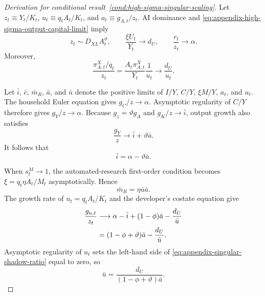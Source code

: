 \begin{proof}[Derivation for conditional result~\ref{cond:high-sigma-singular-scaling}]
Let $z_t\equiv Y_t/K_t$, $u_t\equiv q_tA_t/K_t$, and
$a_t\equiv g_{A,t}/z_t$. AI dominance and
\eqref{eq:appendix-high-sigma-output-capital-limit} imply
\begin{equation}
    z_t\sim D_{XL}A_t^\vartheta,
    \qquad
    \frac{\xi U_t}{Y_t}\longrightarrow d_U,
    \qquad
    \frac{r_t}{z_t}\longrightarrow\alpha.
    \label{eq:appendix-singular-production-limits}
\end{equation}
Moreover,
\begin{equation}
    \frac{\pi^X_{A,t}/q_t}{z_t}
    =
    \frac{A_t\pi^X_{A,t}}{Y_t}\frac{1}{u_t}
    \longrightarrow
    \frac{d_U}{u_t}.
    \label{eq:appendix-singular-profit-value}
\end{equation}

Let $\bar i$, $\bar c$, $\bar m_R$, $\bar a$, and $\bar u$ denote the
positive limits of $I/Y$, $C/Y$, $\xi M/Y$, $a_t$, and $u_t$. The household
Euler equation gives $g_C/z\to\alpha$. Asymptotic regularity of $C/Y$ therefore
gives $g_Y/z\to\alpha$. Because
$g_z=\vartheta g_A$ and $g_K/z\to\bar i$, output growth also satisfies
\[
    \frac{g_Y}{z}
    \longrightarrow
    \bar i+\vartheta\bar a.
\]
It follows that
\begin{equation}
    \bar i=\alpha-\vartheta\bar a.
    \label{eq:appendix-singular-investment}
\end{equation}

When $s^M_t\to1$, the automated-research first-order condition becomes
$\xi=q_t\eta\dot A_t/M_t$ asymptotically. Hence
\begin{equation}
    \bar m_R
    =\eta\bar u\bar a.
    \label{eq:appendix-singular-research-share}
\end{equation}
The growth rate of $u_t=q_tA_t/K_t$ and the developer's costate equation give
\begin{align}
    \frac{g_{u,t}}{z_t}
    &\longrightarrow
    \alpha-\bar i+(1-\phi)\bar a-\frac{d_U}{\bar u}\notag\\
    &=
    (1-\phi+\vartheta)\bar a-\frac{d_U}{\bar u}.
    \label{eq:appendix-singular-shadow-ratio}
\end{align}
Asymptotic regularity of $u_t$ sets the left-hand side of
\eqref{eq:appendix-singular-shadow-ratio} equal to zero, so
\begin{equation}
    \bar u
    =
    \frac{d_U}{(1-\phi+\vartheta)\bar a}.
    \label{eq:appendix-singular-shadow-limit}
\end{equation}


\end{proof}
